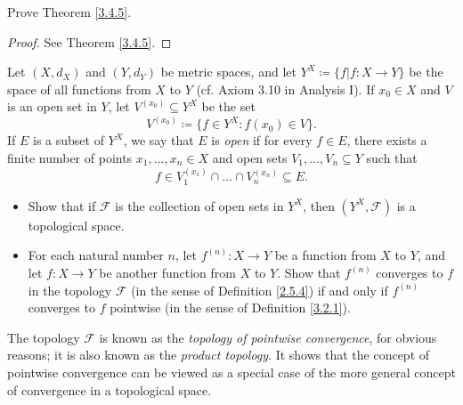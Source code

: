 \begin{exercise}\label{ex 3.4.3}
    Prove Theorem \ref{3.4.5}.
\end{exercise}

\begin{proof}
    See Theorem \ref{3.4.5}.
\end{proof}

\begin{exercise}\label{ex 3.4.4}
    Let \((X, d_X)\) and \((Y, d_Y)\) be metric spaces, and let \(Y^X \coloneqq \{f | f : X \to Y \}\) be the space of all functions from \(X\) to \(Y\)
    (cf. Axiom 3.10 in Analysis I).
    If \(x_0 \in X\) and \(V\) is an open set in \(Y\), let \(V^{(x_0)} \subseteq Y^X\) be the set
    \[
        V^{(x_0)} \coloneqq \big\{f \in Y^X : f(x_0) \in V\big\}.
    \]
    If \(E\) is a subset of \(Y^X\), we say that \(E\) is \emph{open} if for every \(f \in E\), there exists a finite number of points \(x_1, \dots, x_n \in X\) and open sets \(V_1, \dots, V_n \subseteq Y\) such that
    \[
        f \in V_1^{(x_1)} \cap \dots \cap V_n^{(x_n)} \subseteq E.
    \]
    \begin{itemize}
        \item Show that if \(\mathcal{F}\) is the collection of open sets in \(Y^X\), then \((Y^X , \mathcal{F})\) is a topological space.
        \item For each natural number \(n\), let \(f^{(n)} : X \to Y\) be a function from \(X\) to \(Y\), and let \(f : X \to Y\) be another function from \(X\) to \(Y\).
              Show that \(f^{(n)}\) converges to \(f\) in the topology \(\mathcal{F}\) (in the sense of Definition \ref{2.5.4}) if and only if \(f^{(n)}\) converges to \(f\) pointwise (in the sense of Definition \ref{3.2.1}).
    \end{itemize}
    The topology \(\mathcal{F}\) is known as the \emph{topology of pointwise convergence}, for obvious reasons;
    it is also known as the \emph{product topology}.
    It shows that the concept of pointwise convergence can be viewed as a special case of the more general concept of convergence in a topological space.
\end{exercise}

